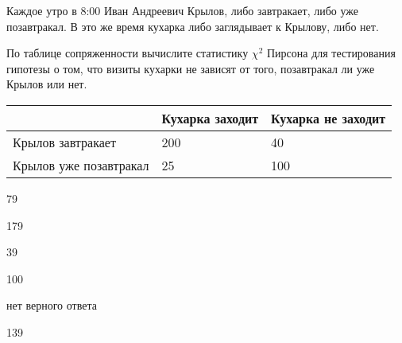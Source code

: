 
\begin{question}
Каждое утро в 8:00 Иван Андреевич Крылов, либо завтракает, либо уже
позавтракал. В это же время кухарка либо заглядывает к Крылову, либо
нет.

По таблице сопряженности вычислите статистику \(\chi^2\) Пирсона для
тестирования гипотезы о том, что визиты кухарки не зависят от того,
позавтракал ли уже Крылов или нет.

\begin{longtable}[]{@{}lll@{}}
\toprule
& Кухарка заходит & Кухарка не заходит \\
\midrule
\endhead
Крылов завтракает & 200 & 40 \\
Крылов уже позавтракал & 25 & 100 \\
\bottomrule
\end{longtable}
\begin{answerlist}
  \item 79
  \item 179
  \item 39
  \item 100
  \item нет верного ответа
  \item 139
\end{answerlist}
\end{question}


